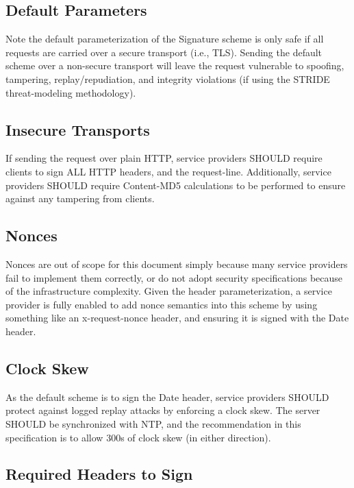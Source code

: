 \subsection*{Default Parameters}

Note the default parameterization of the {\ttfamily Signature} scheme is only safe if all requests are carried over a secure transport (i.\+e., T\+LS). Sending the default scheme over a non-\/secure transport will leave the request vulnerable to spoofing, tampering, replay/repudiation, and integrity violations (if using the S\+T\+R\+I\+DE threat-\/modeling methodology).

\subsection*{Insecure Transports}

If sending the request over plain H\+T\+TP, service providers S\+H\+O\+U\+LD require clients to sign A\+LL H\+T\+TP headers, and the {\ttfamily request-\/line}. Additionally, service providers S\+H\+O\+U\+LD require {\ttfamily Content-\/\+M\+D5} calculations to be performed to ensure against any tampering from clients.

\subsection*{Nonces}

Nonces are out of scope for this document simply because many service providers fail to implement them correctly, or do not adopt security specifications because of the infrastructure complexity. Given the {\ttfamily header} parameterization, a service provider is fully enabled to add nonce semantics into this scheme by using something like an {\ttfamily x-\/request-\/nonce} header, and ensuring it is signed with the {\ttfamily Date} header.

\subsection*{Clock Skew}

As the default scheme is to sign the {\ttfamily Date} header, service providers S\+H\+O\+U\+LD protect against logged replay attacks by enforcing a clock skew. The server S\+H\+O\+U\+LD be synchronized with N\+TP, and the recommendation in this specification is to allow 300s of clock skew (in either direction).

\subsection*{Required Headers to Sign}

